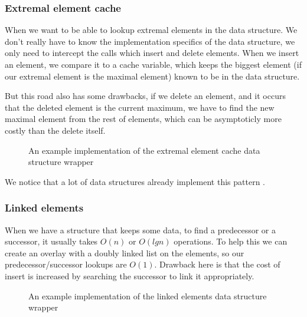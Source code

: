 \documentclass[a4paper,11pt]{article}
\begin{document}
		\subsubsection{Extremal element cache}

			When we want to be able to lookup extremal elements in the data structure. We don't really have
			to know the implementation specifics of the data structure, we only need to intercept the calls
			which insert and delete elements. When we insert an element, we compare it to a cache variable,
			which keeps the biggest element (if our extremal element is the maximal element) known to be in
			the data structure.

			But this road also has some drawbacks, if we delete an element, and it occurs that the deleted
			element is the current maximum, we have to find the new maximal element from the rest of
			elements, which can be asymptoticly more costly than the delete itself.


			\begin{figure}
				

				\caption{An example implementation of the extremal element cache data structure wrapper}

				\label{fig:elem-cache}
			\end{figure}

			We notice that a lot of data structures already implement this pattern \cite{Wiveb}.

        \subsubsection{Linked elements}\label{sec:gdsm:le}

			When we have a structure that keeps some data, to find a predecessor or a successor, it usually
			takes $O(n)$ or $O(lg n)$ operations.  To help this we can create an overlay with a doubly
			linked list on the elements, so our predecessor/successor lookups are $O(1)$. Drawback here is
			that the cost of insert is increased by searching the successor to link it appropriately.

			\begin{figure}
				

				\caption{An example implementation of the linked elements data structure wrapper}

				\label{fig:linked-cache}
			\end{figure}
\end{document}
